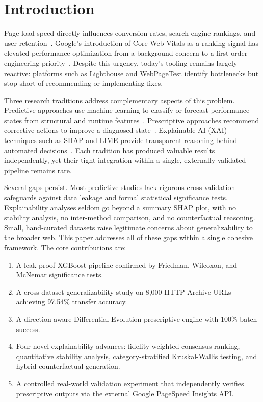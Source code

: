 \documentclass{svproc}
\begin{document}
\section{Introduction}

Page load speed directly influences conversion rates, search-engine rankings, and user retention~\cite{kaushik2024,xin2023}. Google's introduction of Core Web Vitals as a ranking signal has elevated performance optimization from a background concern to a first-order engineering priority~\cite{mathur2024,vanriet2023}. Despite this urgency, today's tooling remains largely reactive: platforms such as Lighthouse and WebPageTest identify bottlenecks but stop short of recommending or implementing fixes.

Three research traditions address complementary aspects of this problem. Predictive approaches use machine learning to classify or forecast performance states from structural and runtime features~\cite{ghattas2025,mathur2024,sehwag2024,huang2023}. Prescriptive approaches recommend corrective actions to improve a diagnosed state~\cite{notz2024,surianarayanan2023,goscien2025,asha2025}. Explainable AI (XAI) techniques such as SHAP and LIME provide transparent reasoning behind automated decisions~\cite{salih2024,hassija2024,ortigossa2024}. Each tradition has produced valuable results independently, yet their tight integration within a single, externally validated pipeline remains rare.

Several gaps persist. Most predictive studies lack rigorous cross-validation safeguards against data leakage and formal statistical significance tests. Explainability analyses seldom go beyond a summary SHAP plot, with no stability analysis, no inter-method comparison, and no counterfactual reasoning. Small, hand-curated datasets raise legitimate concerns about generalizability to the broader web. This paper addresses all of these gaps within a single cohesive framework. The core contributions are:

\begin{enumerate}
    \item A leak-proof XGBoost pipeline confirmed by Friedman, Wilcoxon, and McNemar significance tests.
    \item A cross-dataset generalizability study on 8,000 HTTP Archive URLs achieving 97.54\% transfer accuracy.
    \item A direction-aware Differential Evolution prescriptive engine with 100\% batch success.
    \item Four novel explainability advances: fidelity-weighted consensus ranking, quantitative stability analysis, category-stratified Kruskal-Wallis testing, and hybrid counterfactual generation.
    \item A controlled real-world validation experiment that independently verifies prescriptive outputs via the external Google PageSpeed Insights API.
\end{enumerate}
\end{document}
